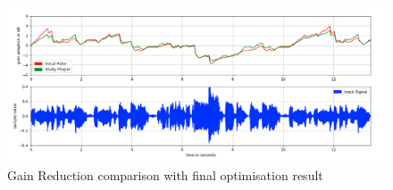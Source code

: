 \begin{figure}
\includegraphics[width=\textwidth]{images/compareResult}
\caption{Gain Reduction comparison with final optimisation result}
\end{figure}